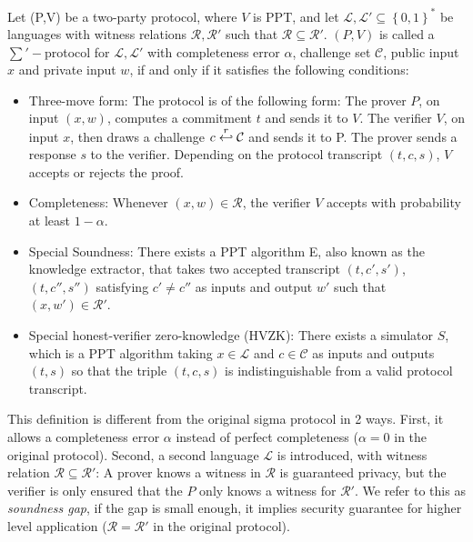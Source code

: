 \begin{definition}
  \label{def:zkp-sum-protocol}
  Let (P,V) be a two-party protocol, where $V$ is PPT, and let
  $\mathcal{L},\mathcal{L'} \subseteq \left\{ 0,1 \right\}^*$ be languages with
  witness relations $\mathcal{R},\mathcal{R'}$ such that $\mathcal{R}
  \subseteq \mathcal{R'}$. $(P,V)$ is called a $\sum'-$protocol for
  $\mathcal{L}, \mathcal{L'}$ with completeness error $\alpha$, challenge set
  $\mathcal{C}$, public input $x$ and private input $w$, if and only if it
  satisfies the following conditions:
  \begin{itemize}
  \item Three-move form: The protocol is of the following form: The
    prover $P$, on input $(x,w)$, computes a commitment $t$ and sends it
    to $V$. The verifier $V$, on input $x$, then draws a challenge
    $c \stackrel{r}{\hookleftarrow} \mathcal{C}$ and sends it to P. The prover sends a
    response $s$ to the verifier. Depending on the protocol transcript
    $(t,c,s)$, $V$ accepts or rejects the proof.
  \item Completeness: Whenever $(x,w) \in \mathcal{R}$, the verifier
    $V$ accepts with probability at least $1 - \alpha$.
  \item Special Soundness: There exists a PPT algorithm E, also known as
    the knowledge extractor, that takes two accepted transcript
    $(t,c',s')$,$(t,c'',s'')$ satisfying $c' \neq c''$ as inputs and
    output $w'$ such that $(x,w') \in \mathcal{R'}$.
  \item Special honest-verifier zero-knowledge (HVZK): There exists a
    simulator $S$, which is a PPT
    algorithm taking $x\in \mathcal{L}$ and $c \in \mathcal{C}$ as
    inputs and outputs $(t,s)$ so that the triple $(t,c,s)$ is
    indistinguishable from a valid protocol transcript.
  \end{itemize}
\end{definition}

This definition is different from the original sigma protocol in 2 ways.
First, it allows a completeness error $\alpha$ instead of perfect completeness
($\alpha=0$ in the original protocol).
Second, a second language $\mathcal{L}$ is introduced, with witness relation
$\mathcal{R} \subseteq \mathcal{R'}$: A prover knows a witness in $\mathcal{R}$
is guaranteed privacy, but the verifier is only ensured that the $P$ only knows
a witness for $\mathcal{R'}$. We refer to this as \emph{soundness gap}, if the
gap is small enough, it implies security guarantee for higher level application
($\mathcal{R} = \mathcal{R'}$ in the original protocol).


